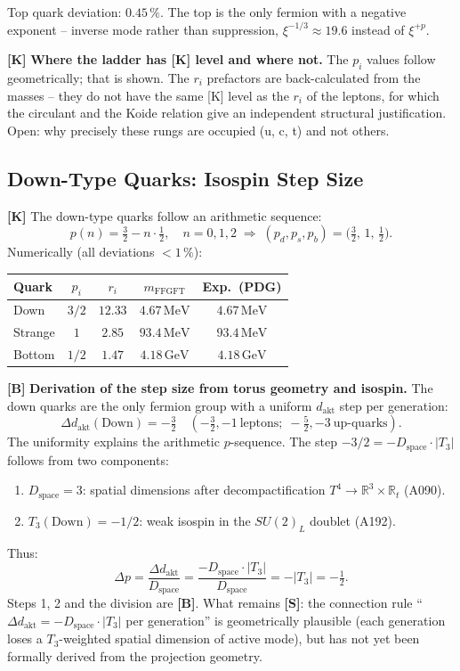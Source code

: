 Top quark deviation: $0{.}45\,\%$. The top is the only fermion with a negative
exponent -- inverse mode rather than suppression, $\xi^{-1/3}\approx19{.}6$
instead of $\xi^{+p}$.

\textbf{[K]} \textbf{Where the ladder has [K] level and where not.}
The $p_i$ values follow geometrically; that is shown. The $r_i$ prefactors
are back-calculated from the masses -- they do not have the same [K] level
as the $r_i$ of the leptons, for which the circulant and the Koide relation give
an independent structural justification. Open: why precisely these rungs are
occupied (u, c, t) and not others.

\subsection{Down-Type Quarks: Isospin Step Size}

\textbf{[K]} The down-type quarks follow an arithmetic sequence:
\[
  p(n) = \tfrac32 - n\cdot\tfrac12, \quad n=0,1,2 \;\Rightarrow\;
  (p_d,p_s,p_b) = \bigl(\tfrac32,\,1,\,\tfrac12\bigr).
\]
Numerically (all deviations $<1\,\%$):

\begin{center}
\renewcommand{\arraystretch}{1.3}
{\small\begin{tabular}{lcccc}
\toprule
Quark & $p_i$ & $r_i$ & $m_\text{FFGFT}$ & Exp.\ (PDG) \\
\midrule
Down    & $3/2$ & $12{.}33$ & $4{.}67\,\text{MeV}$  & $4{.}67\,\text{MeV}$ \\
Strange & $1$   & $2{.}85$  & $93{.}4\,\text{MeV}$  & $93{.}4\,\text{MeV}$ \\
Bottom  & $1/2$ & $1{.}47$  & $4{.}18\,\text{GeV}$  & $4{.}18\,\text{GeV}$ \\
\bottomrule
\end{tabular}}
\renewcommand{\arraystretch}{1.0}
\end{center}

\textbf{[B]} \textbf{Derivation of the step size from torus geometry and isospin.}
The down quarks are the only fermion group with a uniform $d_\text{akt}$ step
per generation:
\[
  \Delta d_\text{akt}(\text{Down}) = -\tfrac32
  \quad(-\tfrac32,-1\ \text{leptons};\;-\tfrac52,-3\ \text{up-quarks}).
\]
The uniformity explains the arithmetic $p$-sequence. The step
$-3/2 = -D_\text{space}\cdot|T_3|$ follows from two components:
\begin{enumerate}[leftmargin=2em,itemsep=1pt,topsep=2pt]
  \item $D_\text{space}=3$: spatial dimensions after decompactification
    $T^4\to\mathbb{R}^3\times\mathbb{R}_t$ (A090).
  \item $T_3(\text{Down})=-1/2$: weak isospin in the $SU(2)_L$ doublet
    (A192).
\end{enumerate}
Thus:
\[
  \Delta p = \frac{\Delta d_\text{akt}}{D_\text{space}}
  = \frac{-D_\text{space}\cdot|T_3|}{D_\text{space}} = -|T_3| = -\tfrac12.
\]
Steps 1, 2 and the division are \textbf{[B]}. What remains \textbf{[S]}:
the connection rule ``$\Delta d_\text{akt} = -D_\text{space}\cdot|T_3|$ per
generation'' is geometrically plausible (each generation loses a $T_3$-weighted
spatial dimension of active mode), but has not yet been formally derived from the
projection geometry.

